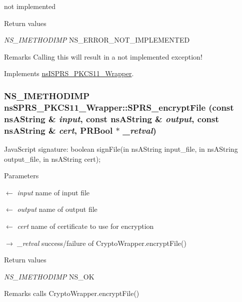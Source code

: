 not implemented 
\begin{DoxyRetVals}{Return values}
\item[{\em NS\_\-IMETHODIMP}]NS\_\-ERROR\_\-NOT\_\-IMPLEMENTED \end{DoxyRetVals}
\begin{DoxyRemark}{Remarks}
Calling this will result in a not implemented exception! 
\end{DoxyRemark}


Implements \hyperlink{classnsISPRS__PKCS11__Wrapper}{nsISPRS\_\-PKCS11\_\-Wrapper}.\hypertarget{classnsSPRS__PKCS11__Wrapper_a77930438f26ec1bafd8ab07e8346af26}{
\subsubsection[{SPRS\_\-encryptFile}]{\setlength{\rightskip}{0pt plus 5cm}NS\_\-IMETHODIMP nsSPRS\_\-PKCS11\_\-Wrapper::SPRS\_\-encryptFile (const nsAString \& {\em input}, \/  const nsAString \& {\em output}, \/  const nsAString \& {\em cert}, \/  PRBool $\ast$ {\em \_\-retval})}}
\label{classnsSPRS__PKCS11__Wrapper_a77930438f26ec1bafd8ab07e8346af26}
JavaScript signature: boolean signFile(in nsAString input\_\-file, in nsAString output\_\-file, in nsAString cert); 
\begin{DoxyParams}{Parameters}
\item[\mbox{$\leftarrow$} {\em input}]name of input file \item[\mbox{$\leftarrow$} {\em output}]name of output file \item[\mbox{$\leftarrow$} {\em cert}]name of certificate to use for encryption \item[\mbox{$\rightarrow$} {\em \_\-retval}]success/failure of CryptoWrapper.encryptFile() \end{DoxyParams}

\begin{DoxyRetVals}{Return values}
\item[{\em NS\_\-IMETHODIMP}]NS\_\-OK \end{DoxyRetVals}
\begin{DoxyRemark}{Remarks}
calls CryptoWrapper.encryptFile() 
\end{DoxyRemark}



